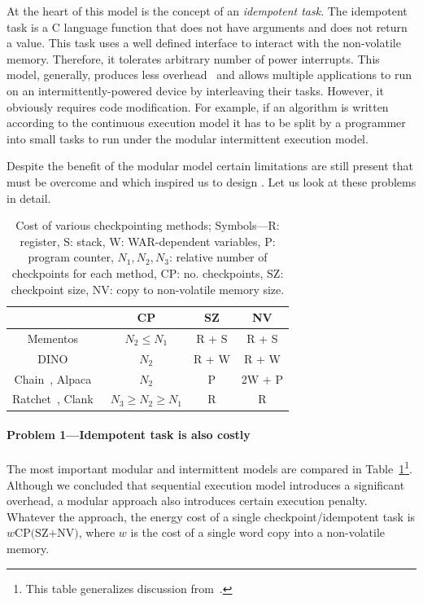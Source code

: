 At the heart of this model is the concept of an \emph{idempotent task}. The idempotent task is a C language function that does not have arguments and does not return a value. This task uses a well defined interface to interact with the non-volatile memory. Therefore, it tolerates arbitrary number of power interrupts. This model, generally, produces less overhead~\cite{chain} and allows multiple applications to run on an intermittently-powered device by interleaving their tasks. However, it obviously requires code modification. For example, if an algorithm is written according to the continuous execution model it has to be split by a programmer into small tasks to run under the modular intermittent execution model.

Despite the benefit of the modular model certain limitations are still present that must be overcome and which inspired us to design \sys. Let us look at these problems in detail.

\begin{table}
	\centering
	\footnotesize
	\begin{tabular}{|c|c|c|c|}
		\hline
		{~} & CP & SZ & NV \\
		\hline\hline
		\!\!Mementos~\cite{mementos}\!\! & \!\!$N_2\leq N_1$\!\! & \!\!R + S\!\! & \!\!R + S\!\! \\
		\!\!DINO~\cite{dino}\!\! & $N_2$\!\! & \!\!R + W\!\! & \!\!R + W\!\! \\
		\!\!Chain~\cite{chain}, Alpaca~\cite{alpaca}\!\! & \!\!$N_2$\!\! & P\!\! & \!\!2W + P\!\!\\
		\!\!Ratchet~\cite{ratchet}, Clank~\cite{hicks_isca_2017}\!\! & $N_3\geq N_2\geq N_1$\!\! & \!\!R\!\! & R\!\!\\
		\hline 
	\end{tabular}
	\caption{Cost of various checkpointing methods; Symbols---R: register, S: stack, W: WAR-dependent variables, P: program counter, $N_1, N_2, N_3$: relative number of checkpoints for each method, CP: no. checkpoints, SZ: checkpoint size, NV: copy to non-volatile memory size.}
	\label{table:chechpoint_comparison}
\end{table}

\paragraph{Problem 1---Idempotent task is also costly}

The most important modular and intermittent models are compared in Table~\ref{table:chechpoint_comparison}\footnote{This table generalizes discussion from~\cite[Sec. 2.4]{alpaca}.}. Although we concluded that sequential execution model introduces a significant overhead, a modular approach also introduces certain execution penalty. Whatever the approach, the energy cost of a single checkpoint/idempotent task is $w\text{CP(SZ+NV)}$, where $w$ is the cost of a single word copy into a non-volatile memory. 

